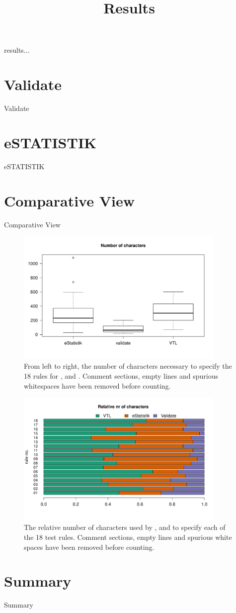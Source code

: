 \title{Results}

results...

\section{Validate}

Validate

\section{eSTATISTIK}

eSTATISTIK

\section{Comparative View}

Comparative View

\begin{figure}
\centering
\includegraphics[width=0.9\textwidth]{fig/boxplot.pdf}
\caption{From left to right, the number of characters necessary
to specify the 18 rules for ,  and
. Comment sections, empty lines and spurious whitespaces 
have been removed before
counting. }
\end{figure}

\begin{figure}
\centering
\includegraphics[width=0.9\textwidth]{fig/barplot.pdf}
\caption{The relative number of characters used by ,
 and  to specify each of the 18 test rules.  Comment
sections, empty lines and spurious white spaces have been removed before counting. }
\end{figure}


\section{Summary}

Summary
